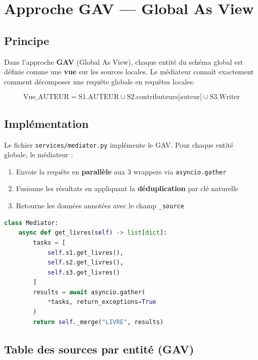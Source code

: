 \documentclass[12pt,a4paper]{article}
\begin{document}
\section{Approche GAV — Global As View}

\subsection{Principe}
Dans l'approche \textbf{GAV} (Global As View), chaque entité du schéma global est définie comme une \textbf{vue} sur les sources locales. Le médiateur connaît exactement comment décomposer une requête globale en requêtes locales.

\[
\text{Vue\_AUTEUR} = \text{S1.AUTEUR} \cup \text{S2.contributeurs[auteur]} \cup \text{S3.Writer}
\]

\subsection{Implémentation}
Le fichier \texttt{services/mediator.py} implémente le GAV. Pour chaque entité globale, le médiateur :

\begin{enumerate}
  \item Envoie la requête en \textbf{parallèle} aux 3 wrappers via \texttt{asyncio.gather}
  \item Fusionne les résultats en appliquant la \textbf{déduplication} par clé naturelle
  \item Retourne les données annotées avec le champ \texttt{\_source}
\end{enumerate}

\begin{lstlisting}[language=Python, caption=GAV — Lecture parallèle et fusion]
class Mediator:
    async def get_livres(self) -> list[dict]:
        tasks = [
            self.s1.get_livres(),
            self.s2.get_livres(),
            self.s3.get_livres()
        ]
        results = await asyncio.gather(
            *tasks, return_exceptions=True
        )
        return self._merge("LIVRE", results)
\end{lstlisting}

\subsection{Table des sources par entité (GAV)}
\end{document}
